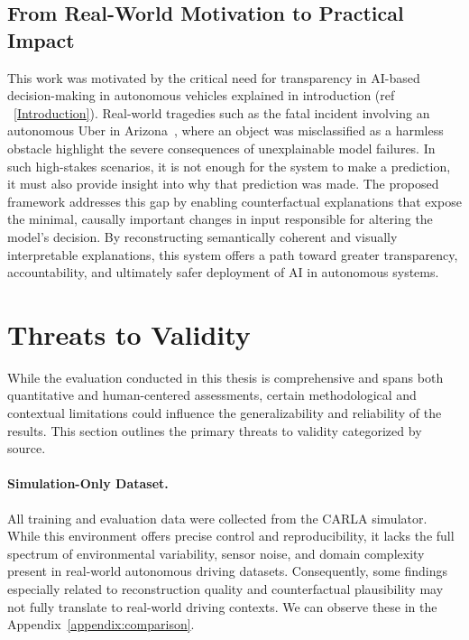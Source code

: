 \subsection{From Real-World Motivation to Practical Impact}
This work was motivated by the critical need for transparency in AI-based decision-making in autonomous vehicles explained in introduction (ref ~\ref{Introduction}). Real-world tragedies such as the fatal incident involving an autonomous Uber in Arizona~\autocite{marshall2019uber}, where an object was misclassified as a harmless obstacle highlight the severe consequences of unexplainable model failures. In such high-stakes scenarios, it is not enough for the system to make a prediction, it must also provide insight into why that prediction was made. The proposed framework addresses this gap by enabling counterfactual explanations that expose the minimal, causally important changes in input responsible for altering the model's decision. By reconstructing semantically coherent and visually interpretable explanations, this system offers a path toward greater transparency, accountability, and ultimately safer deployment of AI in autonomous systems.


\section{Threats to Validity} \label{sec:threats_to_validity}

While the evaluation conducted in this thesis is comprehensive and spans both quantitative and human-centered assessments, certain methodological and contextual limitations could influence the generalizability and reliability of the results. This section outlines the primary threats to validity categorized by source.

\vspace{-1em}

\paragraph{Simulation-Only Dataset.} All training and evaluation data were collected from the CARLA simulator. While this environment offers precise control and reproducibility, it lacks the full spectrum of environmental variability, sensor noise, and domain complexity present in real-world autonomous driving datasets. Consequently, some findings especially related to reconstruction quality and counterfactual plausibility may not fully translate to real-world driving contexts. We can observe these in the Appendix~\ref{appendix:comparison}.

